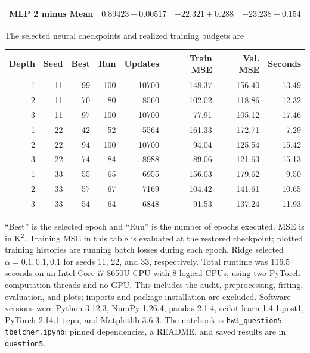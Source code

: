 \documentclass[12pt]{article}
\begin{document}
\begin{enumerate}
\begin{enumerate}[label=\textbf{\Alph*.}, leftmargin=*]
\begin{center}
{\begin{tabular}{l c c c}
           MLP 2 minus Mean & $0.89423\pm0.00517$ & $-22.321\pm0.288$ & $-23.238\pm0.154$ \\
           \bottomrule
       \end{tabular}}
       \end{center}
       The selected neural checkpoints and realized training budgets are
       \begin{center}
       {\small
       \begin{tabular}{r r r r r r r r}
           \toprule
           Depth & Seed & Best & Run & Updates & Train MSE & Val. MSE & Seconds \\
           \midrule
           1 & 11 & 99 & 100 & 10700 & 148.37 & 156.40 & 13.49 \\
           2 & 11 & 70 & 80 & 8560 & 102.02 & 118.86 & 12.32 \\
           3 & 11 & 97 & 100 & 10700 & 77.91 & 105.12 & 17.46 \\
           1 & 22 & 42 & 52 & 5564 & 161.33 & 172.71 & 7.29 \\
           2 & 22 & 94 & 100 & 10700 & 94.04 & 125.54 & 15.42 \\
           3 & 22 & 74 & 84 & 8988 & 89.06 & 121.63 & 15.13 \\
           1 & 33 & 55 & 65 & 6955 & 156.03 & 179.62 & 9.50 \\
           2 & 33 & 57 & 67 & 7169 & 104.42 & 141.61 & 10.65 \\
           3 & 33 & 54 & 64 & 6848 & 91.53 & 137.24 & 11.93 \\
           \bottomrule
       \end{tabular}}
       \end{center}
       ``Best'' is the selected epoch and ``Run'' is the number of epochs
       executed. MSE is in K$^2$. Training MSE in this table is evaluated
       at the restored checkpoint; plotted training histories are running
       batch losses during each epoch. Ridge selected
$\alpha=0.1, 0.1, 0.1$ for seeds 11, 22, and 33, respectively.
       Total runtime was 116.5 seconds on an Intel
       Core i7-8650U CPU with 8 logical CPUs, using two PyTorch
       computation threads and no GPU. This includes the audit,
       preprocessing, fitting, evaluation, and plots; imports and package
       installation are excluded. Software versions were Python 3.12.3,
       NumPy 1.26.4, pandas 2.1.4, scikit-learn 1.4.1.post1,
       PyTorch 2.14.1+cpu, and Matplotlib 3.6.3. The notebook is
       \texttt{hw3\_question5-tbelcher.ipynb}; pinned dependencies,
       a README, and saved results are in \texttt{question5}.


\end{enumerate}
\end{enumerate}
\end{document}
